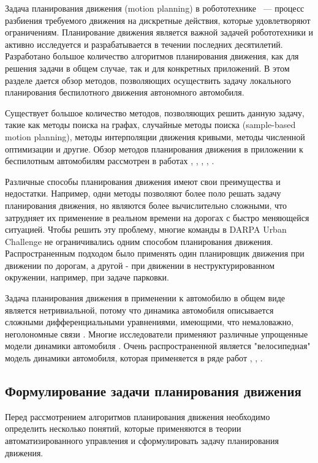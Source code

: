 Задача планирования движения (motion planning) в робототехнике ~--- процесс разбиения требуемого движения
на дискретные действия, которые удовлетворяют ограничениям. Планирование движения является важной задачей
робототехники и активно  исследуется и разрабатывается в течении последних десятилетий. Разработано большое
количество алгоритмов планирования движения, как для решения задачи в общем случае, так и для конкретных
приложений. В этом разделе дается обзор методов, позволяющих осуществить задачу локального планирования
беспилотного движения автономного автомобиля.

Существует большое количество методов, позволяющих решить данную задачу, такие как методы поиска на графах,
случайные методы поиска (sample-based motion planning), методы интерполяции движения кривыми, методы
численной оптимизации и другие. Обзор методов планирования движения в приложении к беспилотным автомобилям
рассмотрен в работах \cite{motion_planning_review},
\cite{motion_planning_overview_obstacles}, \cite{motion_planning_overview_modern},
\cite{motion_planning_review_2}, \cite{motion_planning_review_3}.

Различные способы планирования движения имеют свои преимущества и недостатки. Например, одни методы позволяют
более поло решать задачу планирования движения, но являются более вычислительно сложными, что затрудняет их
применение в реальном времени на дорогах с быстро меняющейся ситуацией.  Чтобы решить эту проблему, многие
команды в DARPA Urban Challenge не ограничивались одним способом планирования движения. Распространенным подходом
было применять один планировщик движения при движении по дорогам, а другой - при движении в неструктурированном окружении,
например, при задаче парковки.

Задача планирования движения в применении к автомобилю в общем виде является нетривиальной, потому что
динамика автомобиля описывается сложными дифференциальными уравнениями, имеющими, что немаловажно,
неголономные связи \cite{car_frund}. Многие исследователи применяют различные упрощенные модели динамики
автомобиля \cite{car_dynamics_1}. Очень распространенной является "велосипедная" модель динамики
автомобиля, которая применяется в ряде работ \cite{car_dynamics_bycicle_model_1}, \cite{car_dynamics_bycicle_model_2},
\cite{darpa_annieway_navigation}.


\subsection{Формулирование задачи планирования движения}
Перед рассмотрением алгоритмов планирования движения необходимо определить несколько понятий, которые
применяются в теории автоматизированного управления и сформулировать задачу планирования движения.

